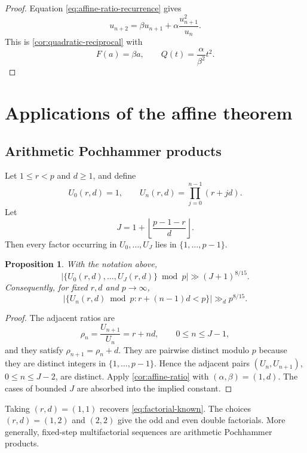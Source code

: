 \documentclass[11pt,reqno]{amsart}
\numberwithin{equation}{section}
\newtheorem{proposition}[proposition]{Proposition}
\theoremstyle{definition}
\theoremstyle{remark}
\begin{document}
\begin{proof}
Equation \eqref{eq:affine-ratio-recurrence} gives
\[
  u_{n+2}
  =\beta u_{n+1}+\alpha\frac{u_{n+1}^2}{u_n}.
\]
This is \cref{cor:quadratic-reciprocal} with
\[
  F(a)=\beta a,
  \qquad
  Q(t)=\frac{\alpha}{\beta^2}t^2.
\]
\end{proof}

\section{Applications of the affine theorem}\label{sec:affine-applications}

\subsection{Arithmetic Pochhammer products}

Let $1\le r<p$ and $d\ge1$, and define
\begin{equation}\label{eq:pochhammer-def}
  U_0(r,d)=1,
  \qquad
  U_n(r,d)=\prod_{j=0}^{n-1}(r+jd).
\end{equation}
Let
\begin{equation}\label{eq:J-rd}
  J=1+\left\lfloor\frac{p-1-r}{d}\right\rfloor.
\end{equation}
Then every factor occurring in $U_0,\ldots,U_J$ lies in $\{1,\ldots,p-1\}$.

\begin{proposition}\label{prop:pochhammer}
With the notation above,
\begin{equation}\label{eq:pochhammer-bound}
  \left|\{U_0(r,d),\ldots,U_J(r,d)\}\bmod p\right|
  \gg (J+1)^{8/15}.
\end{equation}
Consequently, for fixed $r,d$ and $p\to\infty$,
\[
  \left|\{U_n(r,d)\bmod p:r+(n-1)d<p\}\right|
  \gg_d p^{8/15}.
\]
\end{proposition}

\begin{proof}
The adjacent ratios are
\[
  \rho_n=\frac{U_{n+1}}{U_n}=r+nd,
  \qquad 0\le n\le J-1,
\]
and they satisfy $\rho_{n+1}=\rho_n+d$.  They are pairwise distinct modulo $p$ because they are distinct integers in $\{1,\ldots,p-1\}$.  Hence the adjacent pairs $(U_n,U_{n+1})$, $0\le n\le J-2$, are distinct.  Apply \cref{cor:affine-ratio} with $(\alpha,\beta)=(1,d)$.  The cases of bounded $J$ are absorbed into the implied constant.
\end{proof}

Taking $(r,d)=(1,1)$ recovers \eqref{eq:factorial-known}.  The choices $(r,d)=(1,2)$ and $(2,2)$ give the odd and even double factorials.  More generally, fixed-step multifactorial sequences are arithmetic Pochhammer products.
\end{document}
